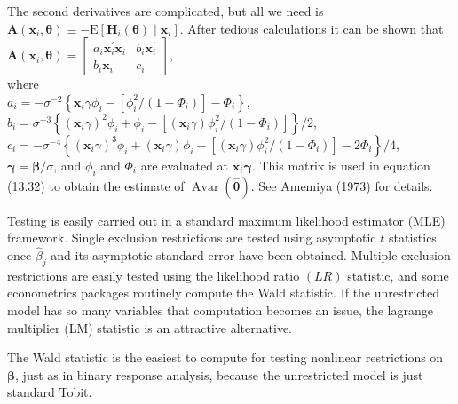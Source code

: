 \documentclass[10pt]{article}
\begin{document}
The second derivatives are complicated, but all we need is $\mathbf{A}\left(\mathbf{x}_{i}, \boldsymbol{\theta}\right) \equiv-\mathrm{E}\left[\mathbf{H}_{i}(\boldsymbol{\theta}) \mid \mathbf{x}_{i}\right]$. After tedious calculations it can be shown that\\
$\mathbf{A}\left(\mathbf{x}_{i}, \boldsymbol{\theta}\right)=\left[\begin{array}{cc}a_{i} \mathbf{x}_{i}^{\prime} \mathbf{x}_{i} & b_{i} \mathbf{x}_{i}^{\prime} \\ b_{i} \mathbf{x}_{i} & c_{i}\end{array}\right]$,\\
where\\
$a_{i}=-\sigma^{-2}\left\{\mathbf{x}_{i} \gamma \phi_{i}-\left[\phi_{i}^{2} /\left(1-\Phi_{i}\right)\right]-\Phi_{i}\right\}$,\\
$b_{i}=\sigma^{-3}\left\{\left(\mathbf{x}_{i} \gamma\right)^{2} \phi_{i}+\phi_{i}-\left[\left(\mathbf{x}_{i} \gamma\right) \phi_{i}^{2} /\left(1-\Phi_{i}\right)\right]\right\} / 2$,\\
$c_{i}=-\sigma^{-4}\left\{\left(\mathbf{x}_{i} \gamma\right)^{3} \phi_{i}+\left(\mathbf{x}_{i} \gamma\right) \phi_{i}-\left[\left(\mathbf{x}_{i} \gamma\right) \phi_{i}^{2} /\left(1-\Phi_{i}\right)\right]-2 \Phi_{i}\right\} / 4$,\\
$\boldsymbol{\gamma}=\boldsymbol{\beta} / \sigma$, and $\phi_{i}$ and $\Phi_{i}$ are evaluated at $\mathbf{x}_{i} \boldsymbol{\gamma}$. This matrix is used in equation (13.32) to obtain the estimate of $\operatorname{Avar}(\hat{\boldsymbol{\theta}})$. See Amemiya (1973) for details.

Testing is easily carried out in a standard maximum likelihood estimator (MLE) framework. Single exclusion restrictions are tested using asymptotic $t$ statistics once $\hat{\beta}_{j}$ and its asymptotic standard error have been obtained. Multiple exclusion restrictions are easily tested using the likelihood ratio $(L R)$ statistic, and some econometrics packages routinely compute the Wald statistic. If the unrestricted model has so many variables that computation becomes an issue, the lagrange multiplier (LM) statistic is an attractive alternative.

The Wald statistic is the easiest to compute for testing nonlinear restrictions on $\boldsymbol{\beta}$, just as in binary response analysis, because the unrestricted model is just standard Tobit.
\end{document}

